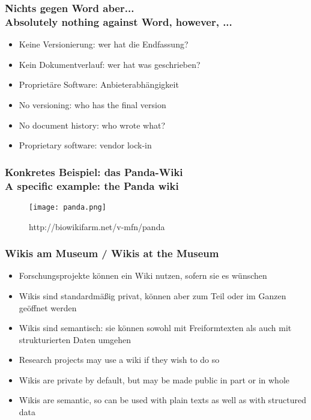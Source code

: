 \documentclass[13pt]{beamer}
\begin{document}
\begin{frame}
  \frametitle{Nichts gegen Word\textsuperscript{\tiny\textregistered} aber... \\
    \textcolor{mfn_green}{Absolutely nothing against Word\textsuperscript{\tiny\textregistered}, however, ...}}
  \begin{itemize}
  \item{Keine Versionierung: wer hat die Endfassung?}
  \item{Kein Dokumentverlauf: wer hat was geschrieben?}
  \item{Proprietäre Software: Anbieterabhängigkeit}
  \end{itemize}
  
  \begin{itemize}
  \item{\textcolor{mfn_green}{No versioning: who has the final version}}
  \item{\textcolor{mfn_green}{No document history: who wrote what?}}
  \item{\textcolor{mfn_green}{Proprietary software: vendor lock-in}}
  \end{itemize}
\end{frame}

%
%

\begin{frame}
  \frametitle{Konkretes Beispiel: das Panda-Wiki\\\textcolor{mfn_green}{A specific example: the Panda wiki}}
  \begin{figure}
    \texttt{[image: panda.png]}
    \caption{http://biowikifarm.net/v-mfn/panda}
  \end{figure}
\end{frame}

\begin{frame}
  \frametitle{Wikis am Museum / \textcolor{mfn_green}{Wikis at the Museum}}

  \begin{itemize}
  \item{Forschungsprojekte können ein Wiki nutzen, sofern sie es wünschen}
  \item{Wikis sind standardmäßig privat, können aber zum Teil oder im Ganzen geöffnet werden}
  \item{Wikis sind semantisch: sie können sowohl mit Freiformtexten als auch mit strukturierten Daten umgehen}
  \end{itemize}
  
  \begin{itemize}
  \item{\textcolor{mfn_green}{Research projects may use a wiki if they wish to do so}}
  \item{\textcolor{mfn_green}{Wikis are private by default, but may be made public in part or in whole}}
  \item{\textcolor{mfn_green}{Wikis are semantic, so can be used with plain texts as well as with structured data}}
  \end{itemize}
\end{frame}
\end{document}
